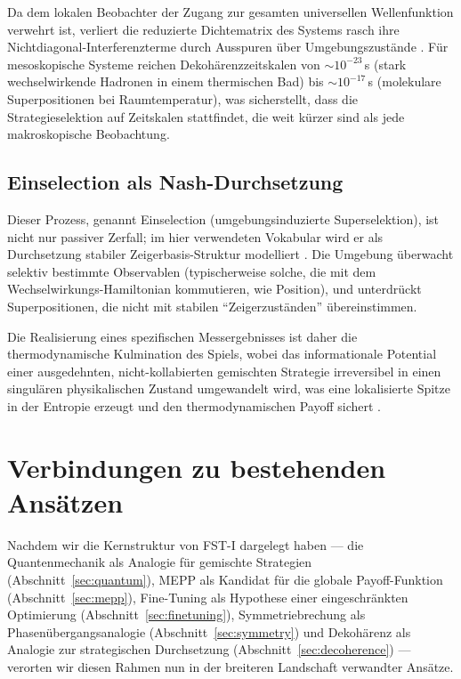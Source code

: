 \documentclass[12pt,a4paper]{article}
\theoremstyle{remark}
\begin{document}
Da dem lokalen Beobachter der Zugang zur gesamten universellen Wellenfunktion verwehrt ist, verliert die reduzierte Dichtematrix des Systems rasch ihre Nichtdiagonal-Interferenzterme durch Ausspuren \"uber Umgebungszust\"ande \citep{Lindblad1976}. F\"ur mesoskopische Systeme reichen Dekoh\"arenzzeitskalen von ${\sim}10^{-23}\,$s (stark wechselwirkende Hadronen in einem thermischen Bad) bis ${\sim}10^{-17}\,$s (molekulare Superpositionen bei Raumtemperatur), was sicherstellt, dass die Strategieselektion auf Zeitskalen stattfindet, die weit k\"urzer sind als jede makroskopische Beobachtung.

\subsection{Einselection als Nash-Durchsetzung}

Dieser Prozess, genannt Einselection (umgebungsinduzierte Superselektion), ist nicht nur passiver Zerfall; im hier verwendeten Vokabular wird er als Durchsetzung stabiler Zeigerbasis-Struktur modelliert \citep{Zurek2003}. Die Umgebung \"uberwacht selektiv bestimmte Observablen (typischerweise solche, die mit dem Wechselwirkungs-Hamiltonian kommutieren, wie Position), und unterdr\"uckt Superpositionen, die nicht mit stabilen ``Zeigerzust\"anden'' \"ubereinstimmen.

Die Realisierung eines spezifischen Messergebnisses ist daher die thermodynamische Kulmination des Spiels, wobei das informationale Potential einer ausgedehnten, nicht-kollabierten gemischten Strategie irreversibel in einen singul\"aren physikalischen Zustand umgewandelt wird, was eine lokalisierte Spitze in der Entropie erzeugt und den thermodynamischen Payoff sichert \citep{Lindblad1976}.

\section{Verbindungen zu bestehenden Ans\"atzen}
\label{sec:connections}

Nachdem wir die Kernstruktur von FST-I dargelegt haben --- die Quantenmechanik als Analogie f\"ur gemischte Strategien (Abschnitt~\ref{sec:quantum}), MEPP als Kandidat f\"ur die globale Payoff-Funktion (Abschnitt~\ref{sec:mepp}), Fine-Tuning als Hypothese einer eingeschr\"ankten Optimierung (Abschnitt~\ref{sec:finetuning}), Symmetriebrechung als Phasen\"ubergangsanalogie (Abschnitt~\ref{sec:symmetry}) und Dekoh\"arenz als Analogie zur strategischen Durchsetzung (Abschnitt~\ref{sec:decoherence}) --- verorten wir diesen Rahmen nun in der breiteren Landschaft verwandter Ans\"atze.
\end{document}
